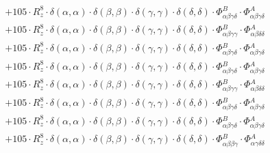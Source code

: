 \documentclass{article}
\begin{document}
\begin{subequations}
\begin{gather}
\begin{array}{c}
 \\[0.2em] 		 + 105 \cdot R_{z}^{8} \cdot \delta{}\left(\alpha{}, \alpha{}\right) \cdot \delta{}\left(\beta{}, \beta{}\right) \cdot \delta{}\left(\gamma{}, \gamma{}\right) \cdot \delta{}\left(\delta{}, \delta{}\right) \cdot \Phi{}^{B}_{\alpha{}\beta{}\gamma{}\delta{}} \cdot \Phi{}^{A}_{\alpha{}\beta{}\gamma{}\delta{}} 
 \\[0.2em] 		 + 105 \cdot R_{z}^{8} \cdot \delta{}\left(\alpha{}, \alpha{}\right) \cdot \delta{}\left(\beta{}, \beta{}\right) \cdot \delta{}\left(\gamma{}, \gamma{}\right) \cdot \delta{}\left(\delta{}, \delta{}\right) \cdot \Phi{}^{B}_{\alpha{}\beta{}\gamma{}\gamma{}} \cdot \Phi{}^{A}_{\alpha{}\beta{}\delta{}\delta{}} 
 \\[0.2em] 		 + 105 \cdot R_{z}^{8} \cdot \delta{}\left(\alpha{}, \alpha{}\right) \cdot \delta{}\left(\beta{}, \beta{}\right) \cdot \delta{}\left(\gamma{}, \gamma{}\right) \cdot \delta{}\left(\delta{}, \delta{}\right) \cdot \Phi{}^{B}_{\alpha{}\beta{}\gamma{}\delta{}} \cdot \Phi{}^{A}_{\alpha{}\beta{}\gamma{}\delta{}} 
 \\[0.2em] 		 + 105 \cdot R_{z}^{8} \cdot \delta{}\left(\alpha{}, \alpha{}\right) \cdot \delta{}\left(\beta{}, \beta{}\right) \cdot \delta{}\left(\gamma{}, \gamma{}\right) \cdot \delta{}\left(\delta{}, \delta{}\right) \cdot \Phi{}^{B}_{\alpha{}\beta{}\gamma{}\delta{}} \cdot \Phi{}^{A}_{\alpha{}\beta{}\gamma{}\delta{}} 
 \\[0.2em] 		 + 105 \cdot R_{z}^{8} \cdot \delta{}\left(\alpha{}, \alpha{}\right) \cdot \delta{}\left(\beta{}, \beta{}\right) \cdot \delta{}\left(\gamma{}, \gamma{}\right) \cdot \delta{}\left(\delta{}, \delta{}\right) \cdot \Phi{}^{B}_{\alpha{}\beta{}\gamma{}\gamma{}} \cdot \Phi{}^{A}_{\alpha{}\beta{}\delta{}\delta{}} 
 \\[0.2em] 		 + 105 \cdot R_{z}^{8} \cdot \delta{}\left(\alpha{}, \alpha{}\right) \cdot \delta{}\left(\beta{}, \beta{}\right) \cdot \delta{}\left(\gamma{}, \gamma{}\right) \cdot \delta{}\left(\delta{}, \delta{}\right) \cdot \Phi{}^{B}_{\alpha{}\beta{}\gamma{}\delta{}} \cdot \Phi{}^{A}_{\alpha{}\beta{}\gamma{}\delta{}} 
 \\[0.2em] 		 + 105 \cdot R_{z}^{8} \cdot \delta{}\left(\alpha{}, \alpha{}\right) \cdot \delta{}\left(\beta{}, \beta{}\right) \cdot \delta{}\left(\gamma{}, \gamma{}\right) \cdot \delta{}\left(\delta{}, \delta{}\right) \cdot \Phi{}^{B}_{\alpha{}\beta{}\gamma{}\delta{}} \cdot \Phi{}^{A}_{\alpha{}\beta{}\gamma{}\delta{}} 
 \\[0.2em] 		 + 105 \cdot R_{z}^{8} \cdot \delta{}\left(\alpha{}, \alpha{}\right) \cdot \delta{}\left(\beta{}, \beta{}\right) \cdot \delta{}\left(\gamma{}, \gamma{}\right) \cdot \delta{}\left(\delta{}, \delta{}\right) \cdot \Phi{}^{B}_{\alpha{}\beta{}\beta{}\gamma{}} \cdot \Phi{}^{A}_{\alpha{}\gamma{}\delta{}\delta{}} 

\end{array}
\end{gather}
\end{subequations}
\end{document}
